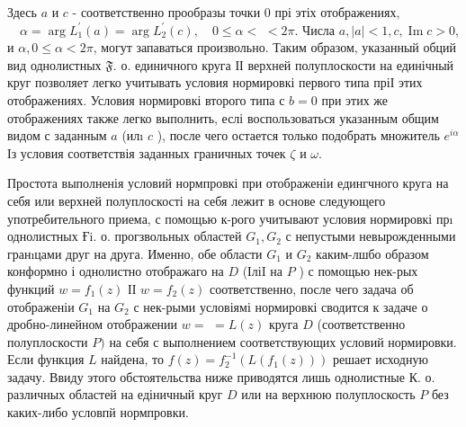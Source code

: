 \documentclass[10pt]{article}
\begin{document}
Здесь $a$ и $c$ - соответственно прообразы точки 0 прі этіх отображениях, $\quad \alpha=\arg L_{1}^{\prime}(a)=\arg L_{2}^{\prime}(c), \quad 0 \leqslant \alpha<$ $<2 \pi$. Числа $a,|a|<1, c, \operatorname{Im} c>0$, и $\alpha, 0 \leqslant \alpha<2 \pi$, могут запаваться произвольно. Таким образом, указанный обций вид однолистных $\mathfrak{F}$. о. единичного круга ІІ верхней полуплоскости на единічный круг позволяет легко учитывать условия нормировкі первого типа пріІ этих отображениях. Условия нормировкі второго типа с $b=0$ при этих же отображениях также легко выполнить, еслі воспользоваться указанным общим видом с заданным $a$ (илı $c$ ), после чего остается только подобрать множитель $e^{i \alpha}$ Із условия соответствія заданных граничных точек $\zeta$ и $\omega$.



Простота выполненія условий нормпровкі при отображеніи едингчного круга на себя или верхней полуплоскості на себя лежит в основе следующего употребительного приема, с помощью к-рого учитывают условия нормировкі прı однолистных Ғi. о. прогзвольных областей $G_{1}, G_{2}$ с непустыми невырожденными гранıцами друг на друга. Именно, обе области $G_{1}$ и $G_{2}$ каким-лшбо образом конформно і однолистно отображаго на $D$ (ІліI на $P$ ) с помощью нек-рых функций $w=f_{1}(z)$ ІІ $w=f_{2}(z)$ соответственно, после чего задача об отображеніи $G_{1}$ на $G_{2}$ с нек-рыми условіямі нормировкі сводится к задаче о дробно-линейном отображении $w=$ $=L(z)$ круга $D$ (соответственно полуплоскости $P)$ на себя с выполнением соответствующих условий нормировки. Если функция $L$ найдена, то $f(z)=f_{2}^{-1}\left(L\left(f_{1}(z)\right)\right)$ решает исходную задачу. Ввиду этого обстоятельства ниже приводятся лишь однолистные К. о. различных областей на едіничный круг $D$ или на верхнюю полуплоскость $P$ без каких-либо условпй нормпровки.
\end{document}
